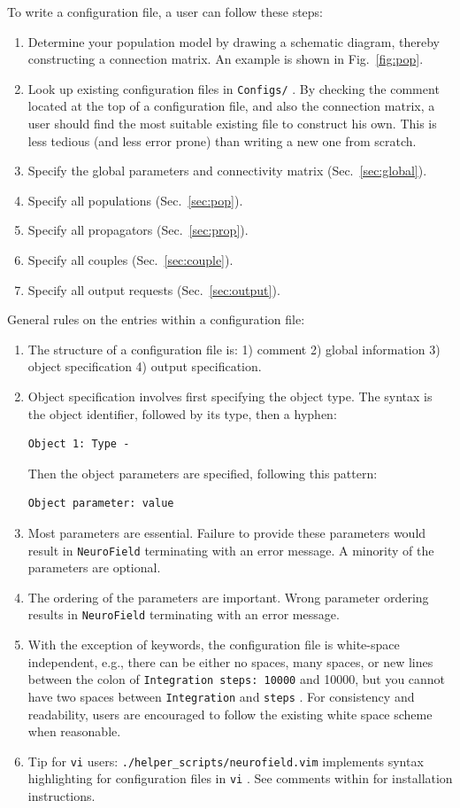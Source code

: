 \documentclass[12pt,a4paper]{article}
\newcommand{\type}[1]{ {\small\small\tt #1} }
\newcommand{\NF}[0]{ \type{NeuroField}}
\begin{document}
To write a configuration file, a user can follow these steps:
\begin{enumerate}
\item Determine your population model by drawing a schematic diagram, thereby constructing a connection matrix. An example is shown in Fig.~\ref{fig:pop}.
\item Look up existing configuration files in \type{Configs/}. By checking the comment located at the top of a configuration file, and also the connection matrix, a user should find the most suitable existing file to construct his own. This is less tedious (and less error prone) than writing a new one from scratch.
\item Specify the global parameters and connectivity matrix (Sec.~\ref{sec:global}).
\item Specify all populations (Sec.~\ref{sec:pop}).
\item Specify all propagators (Sec.~\ref{sec:prop}).
\item Specify all couples (Sec.~\ref{sec:couple}).
\item Specify all output requests (Sec.~\ref{sec:output}).
\end{enumerate}

General rules on the entries within a configuration file:

\begin{enumerate}
	\item The structure of a configuration file is: 1) comment 2) global information 3) object specification 4) output specification.
	\item Object specification involves first specifying the object type. The syntax is the object identifier, followed by its type, then a hyphen:
		\begin{lstlisting}
Object 1: Type -
		\end{lstlisting}
		Then the object parameters are specified, following this pattern:
		\begin{lstlisting}
Object parameter: value
		\end{lstlisting}
	\item Most parameters are essential. Failure to provide these parameters would result in \NF terminating with an error message. A minority of the parameters are optional.
	\item The ordering of the parameters are important. Wrong parameter ordering results in \NF terminating with an error message.
	\item With the exception of keywords, the configuration file is white-space independent, e.g., there can be either no spaces, many spaces, or new lines between the colon of \type{Integration steps: 10000} and 10000, but you cannot have two spaces between \type{Integration} and \type{steps}. For consistency and readability, users are encouraged to follow the existing white space scheme when reasonable.
	\item Tip for \type{vi} users: \type{./helper\_scripts/neurofield.vim} implements syntax highlighting for configuration files in \type{vi}. See comments within for installation instructions.
\end{enumerate}
\end{document}
